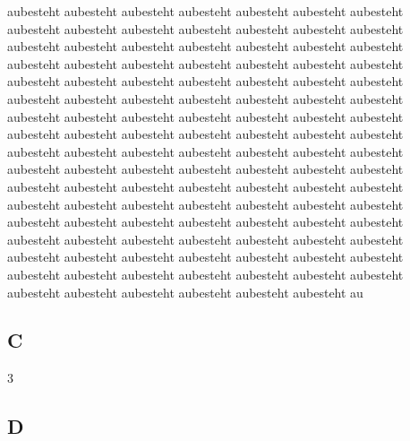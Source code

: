 aubesteht aubesteht aubesteht aubesteht aubesteht aubesteht aubesteht aubesteht aubesteht aubesteht aubesteht aubesteht aubesteht aubesteht aubesteht aubesteht aubesteht aubesteht aubesteht aubesteht aubesteht aubesteht aubesteht aubesteht aubesteht aubesteht aubesteht aubesteht aubesteht aubesteht aubesteht aubesteht aubesteht aubesteht aubesteht aubesteht aubesteht aubesteht aubesteht aubesteht aubesteht aubesteht aubesteht aubesteht aubesteht aubesteht aubesteht aubesteht aubesteht aubesteht aubesteht aubesteht aubesteht aubesteht aubesteht aubesteht aubesteht aubesteht aubesteht aubesteht aubesteht aubesteht aubesteht aubesteht aubesteht aubesteht aubesteht aubesteht aubesteht aubesteht aubesteht aubesteht aubesteht aubesteht aubesteht aubesteht aubesteht aubesteht aubesteht aubesteht aubesteht aubesteht aubesteht aubesteht aubesteht aubesteht aubesteht aubesteht aubesteht aubesteht aubesteht aubesteht aubesteht aubesteht aubesteht aubesteht aubesteht aubesteht aubesteht aubesteht aubesteht aubesteht aubesteht aubesteht aubesteht aubesteht aubesteht aubesteht aubesteht aubesteht aubesteht aubesteht aubesteht aubesteht aubesteht aubesteht aubesteht aubesteht au
\subsection{C}
3
\subsection{D}
 